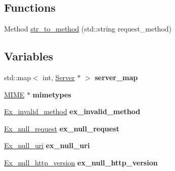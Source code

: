 \subsection*{Functions}
\begin{DoxyCompactItemize}
\item 
Method \hyperlink{namespaceswift_a54d9cafe8eb822e4a2fedef9d724a702}{str\-\_\-to\-\_\-method} (std\-::string request\-\_\-method)
\end{DoxyCompactItemize}
\subsection*{Variables}
\begin{DoxyCompactItemize}
\item 
\hypertarget{namespaceswift_a0d54eeac3847161ee8afa83619ab7cc2}{std\-::map$<$ int, \hyperlink{classswift_1_1_server}{Server} $\ast$ $>$ {\bfseries server\-\_\-map}}\label{namespaceswift_a0d54eeac3847161ee8afa83619ab7cc2}

\item 
\hypertarget{namespaceswift_a81b6163435bed9c1dc013e5adff02083}{\hyperlink{classswift_1_1_m_i_m_e}{M\-I\-M\-E} $\ast$ {\bfseries mimetypes}}\label{namespaceswift_a81b6163435bed9c1dc013e5adff02083}

\item 
\hypertarget{namespaceswift_a89b7510a7218be3e43722a4ee4bc4120}{\hyperlink{classswift_1_1_ex__invalid__method}{Ex\-\_\-invalid\-\_\-method} {\bfseries ex\-\_\-invalid\-\_\-method}}\label{namespaceswift_a89b7510a7218be3e43722a4ee4bc4120}

\item 
\hypertarget{namespaceswift_af95af3029fc8a043ef49e7458c022336}{\hyperlink{classswift_1_1_ex__null__request}{Ex\-\_\-null\-\_\-request} {\bfseries ex\-\_\-null\-\_\-request}}\label{namespaceswift_af95af3029fc8a043ef49e7458c022336}

\item 
\hypertarget{namespaceswift_ae2520bdcfc5988bb8ea0aad5f811ee2a}{\hyperlink{classswift_1_1_ex__null__uri}{Ex\-\_\-null\-\_\-uri} {\bfseries ex\-\_\-null\-\_\-uri}}\label{namespaceswift_ae2520bdcfc5988bb8ea0aad5f811ee2a}

\item 
\hypertarget{namespaceswift_a19796fbd413acda811767422cb144b2e}{\hyperlink{classswift_1_1_ex__null__http__version}{Ex\-\_\-null\-\_\-http\-\_\-version} {\bfseries ex\-\_\-null\-\_\-http\-\_\-version}}\label{namespaceswift_a19796fbd413acda811767422cb144b2e}


\end{DoxyCompactItemize}

